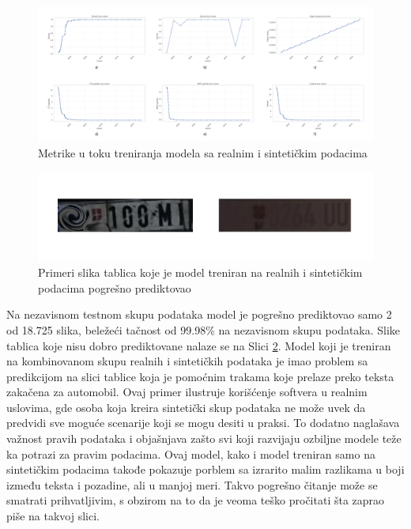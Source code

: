 \documentclass[a4paper,12pt]{article}
\begin{document}
	\begin{figure}[H]
		\centering
		\includegraphics[width=\textwidth]{assets/real-and-synthetic-data-metrics.png}
		\caption{Metrike u toku treniranja modela sa realnim i sintetičkim podacima}
		\label{fig:real-and-synthetic-data-metrics}
	\end{figure}
	
	\begin{figure}[H]
		\centering
		\includegraphics[width=\textwidth]{assets/bad-predictions-real-and-synthetic-data-model.png}
		\caption{Primeri slika tablica koje je model treniran na realnih i sintetičkim podacima pogrešno prediktovao}
		\label{fig:bad-predictions-real-and-synthetic-data-model}
	\end{figure}
	
	Na nezavisnom testnom skupu podataka model je pogrešno prediktovao samo 2 od 18.725 slika, beležeći tačnost od 99.98\% na nezavisnom skupu podataka. Slike tablica koje nisu dobro prediktovane nalaze se na Slici \ref{fig:bad-predictions-real-and-synthetic-data-model}. Model koji je treniran na kombinovanom skupu realnih i sintetičkih podataka je imao problem sa predikcijom na slici tablice koja je pomoćnim trakama koje prelaze preko teksta zakačena za automobil. Ovaj primer ilustruje korišćenje softvera u realnim uslovima, gde osoba koja kreira sintetički skup podataka ne može uvek da predvidi sve moguće scenarije koji se mogu desiti u praksi. To dodatno naglašava važnost pravih podataka i objašnjava zašto svi koji razvijaju ozbiljne modele teže ka potrazi za pravim podacima. Ovaj model, kako i model treniran samo na sintetičkim podacima takođe pokazuje porblem sa izrarito malim razlikama u boji između teksta i pozadine, ali u manjoj meri. Takvo pogrešno čitanje može se smatrati prihvatljivim, s obzirom na to da je veoma teško pročitati šta zaprao piše na takvoj slici.
	
\end{document}
